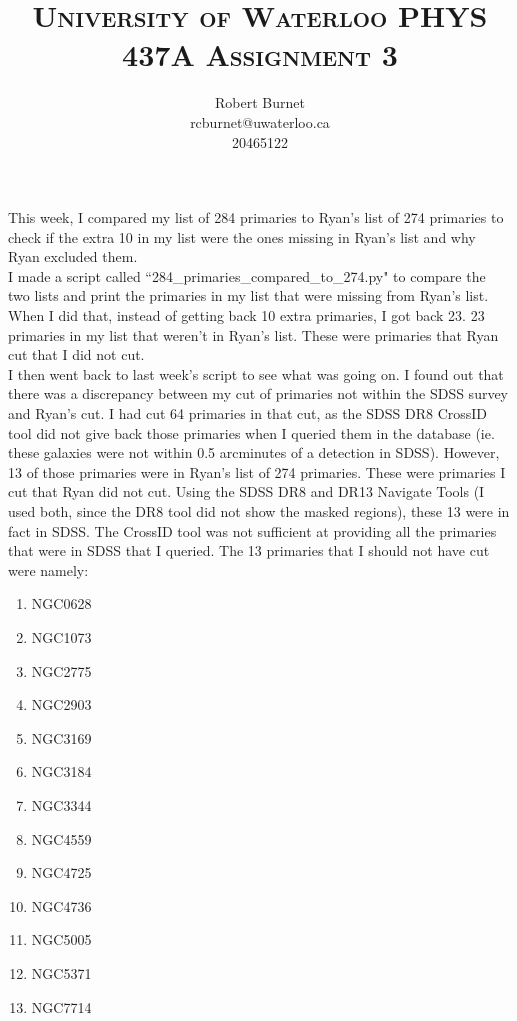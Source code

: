 \documentclass[10pt,letterpaper]{article}
\begin{document}
\title{\scshape\LARGE University of Waterloo \vfill \huge\bfseries PHYS 437A Assignment 3 \vfill}
\author{Robert Burnet \\ rcburnet@uwaterloo.ca \\ 20465122 }
\maketitle

\newpage

This week, I compared my list of 284 primaries to Ryan's list of 274 primaries to check if the extra 10 in my list were the ones missing in Ryan's list and why Ryan excluded them.\\

I made a script called ``284\_primaries\_compared\_to\_274.py" to compare the two lists and print the primaries in my list that were missing from Ryan's list. When I did that, instead of getting back 10 extra primaries, I got back 23. 23 primaries in my list that weren't in Ryan's list. These were primaries that Ryan cut that I did not cut.\\

I then went back to last week's script to see what was going on. I found out that there was a discrepancy between my cut of primaries not within the SDSS survey and Ryan's cut. I had cut 64 primaries in that cut, as the SDSS DR8 CrossID tool did not give back those primaries when I queried them in the database (ie. these galaxies were not within 0.5 arcminutes of a detection in SDSS). However, 13 of those primaries were in Ryan's list of 274 primaries. These were primaries I cut that Ryan did not cut. Using the SDSS DR8 and DR13 Navigate Tools \cite{navigate} \cite{navigate DR13} (I used both, since the DR8 tool did not show the masked regions), these 13 were in fact in SDSS. The CrossID tool was not sufficient at providing all the primaries that were in SDSS that I queried. The 13 primaries that I should not have cut were namely:\\

\begin{enumerate}
\item NGC0628
\item NGC1073
\item NGC2775
\item NGC2903
\item NGC3169
\item NGC3184
\item NGC3344
\item NGC4559
\item NGC4725
\item NGC4736
\item NGC5005
\item NGC5371
\item NGC7714
\end{enumerate}
\end{document}
